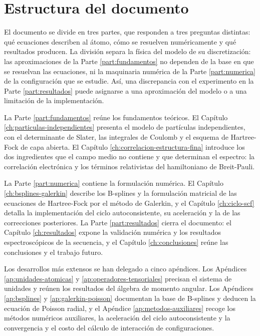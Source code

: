 \section{Estructura del documento}

El documento se divide en tres partes, que responden a tres preguntas distintas: qué ecuaciones describen al átomo, cómo se resuelven numéricamente y qué resultados producen. La división separa la física del modelo de su discretización: las aproximaciones de la Parte \ref{part:fundamentos} no dependen de la base en que se resuelvan las ecuaciones, ni la maquinaria numérica de la Parte \ref{part:numerica} de la configuración que se estudie. Así, una discrepancia con el experimento en la Parte \ref{part:resultados} puede asignarse a una aproximación del modelo o a una limitación de la implementación.

La Parte \ref{part:fundamentos} reúne los fundamentos teóricos. El Capítulo \ref{ch:particulas-independientes} presenta el modelo de partículas independientes, con el determinante de Slater, las integrales de Coulomb y el esquema de Hartree-Fock de capa abierta. El Capítulo \ref{ch:correlacion-estructura-fina} introduce los dos ingredientes que el campo medio no contiene y que determinan el espectro: la correlación electrónica y los términos relativistas del hamiltoniano de Breit-Pauli.

La Parte \ref{part:numerica} contiene la formulación numérica. El Capítulo \ref{ch:bsplines-galerkin} describe los B-splines y la formulación matricial de las ecuaciones de Hartree-Fock por el método de Galerkin, y el Capítulo \ref{ch:ciclo-scf} detalla la implementación del ciclo autoconsistente, su aceleración y la de las correcciones posteriores. La Parte \ref{part:resultados} cierra el documento: el Capítulo \ref{ch:resultados} expone la validación numérica y los resultados espectroscópicos de la secuencia, y el Capítulo \ref{ch:conclusiones} reúne las conclusiones y el trabajo futuro.

Los desarrollos más extensos se han delegado a cinco apéndices. Los Apéndices \ref{ap:unidades-atomicas} y \ref{ap:operadores-tensoriales} precisan el sistema de unidades y reúnen los resultados del álgebra de momento angular. Los Apéndices \ref{ap:bsplines} y \ref{ap:galerkin-poisson} documentan la base de B-splines y deducen la ecuación de Poisson radial, y el Apéndice \ref{ap:metodos-auxiliares} recoge los métodos numéricos auxiliares, la aceleración del ciclo autoconsistente y la convergencia y el costo del cálculo de interacción de configuraciones.

